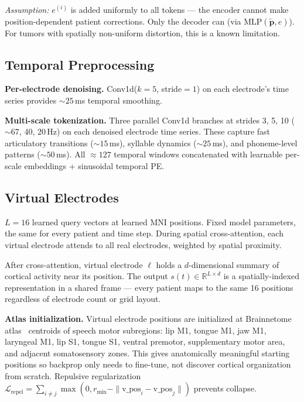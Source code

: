 \documentclass[11pt,letterpaper]{article}
\newcommand{\bfp}{\mathbf{p}}
\newcommand{\R}{\mathbb{R}}
\begin{document}
\textcolor{BrickRed}{\textit{Assumption:} $e^{(i)}$ is added uniformly to all tokens --- the encoder cannot make position-dependent patient corrections. Only the decoder can (via $\text{MLP}(\tilde{\bfp}, e)$). For tumors with spatially non-uniform distortion, this is a known limitation.}


\subsection{Temporal Preprocessing}

\textbf{Per-electrode denoising.} Conv1d($k{=}5$, stride${=}1$) on each electrode's time series provides ${\sim}25$\,ms temporal smoothing.

\textbf{Multi-scale tokenization.} Three parallel Conv1d branches at strides 3, 5, 10 (${\sim}67$, 40, 20\,Hz) on each denoised electrode time series. These capture fast articulatory transitions (${\sim}15$\,ms), syllable dynamics (${\sim}25$\,ms), and phoneme-level patterns (${\sim}50$\,ms). All ${\approx}127$ temporal windows concatenated with learnable per-scale embeddings + sinusoidal temporal PE.


\subsection{Virtual Electrodes}\label{sec:virtual-electrodes}

$L = 16$ learned query vectors at learned MNI positions. Fixed model parameters, the same for every patient and time step. During spatial cross-attention, each virtual electrode attends to all real electrodes, weighted by spatial proximity.

After cross-attention, virtual electrode $\ell$ holds a $d$-dimensional summary of cortical activity near its position. The output $s(t) \in \R^{L \times d}$ is a spatially-indexed representation in a shared frame --- every patient maps to the same 16 positions regardless of electrode count or grid layout.

\textbf{Atlas initialization.} Virtual electrode positions are initialized at Brainnetome atlas~\cite{fan2016} centroids of speech motor subregions: lip M1, tongue M1, jaw M1, laryngeal M1, lip S1, tongue S1, ventral premotor, supplementary motor area, and adjacent somatosensory zones. This gives anatomically meaningful starting positions so backprop only needs to fine-tune, not discover cortical organization from scratch. Repulsive regularization $\mathcal{L}_{\text{repel}} = \sum_{i \neq j} \max(0, r_{\min} - \|\text{v\_pos}_i - \text{v\_pos}_j\|)$ prevents collapse.
\end{document}
